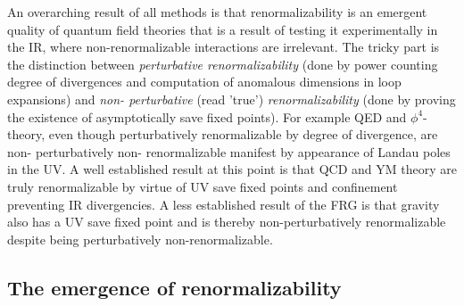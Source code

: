 An overarching result of all methods is that renormalizability is an emergent quality of quantum field theories that is a result of testing it experimentally in the IR, where non-renormalizable interactions are irrelevant. The tricky part is the distinction between \emph{perturbative renormalizability} (done by power counting degree of divergences and computation of anomalous dimensions in loop expansions) and \emph{non- perturbative} (read ’true’) \emph{renormalizability} (done by proving the existence of asymptotically save fixed points). For example QED and $\phi^4$-theory, even though perturbatively renormalizable by degree of divergence, are non- perturbatively non- renormalizable manifest by appearance of Landau poles in the UV. A well established result at this point is that QCD and YM theory are truly renormalizable by virtue of UV save fixed points and confinement preventing IR divergencies. A less established result of the FRG is that gravity also has a UV save fixed point and is thereby non-perturbatively renormalizable despite being perturbatively non-renormalizable.

\subsection{The emergence of renormalizability}

